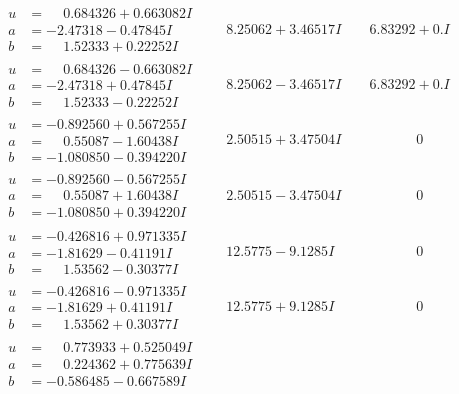 \documentclass[1p]{elsarticle_modified}
\theoremstyle{definition}
\begin{document}
$$\begin{array}{c|c|c}
\begin{aligned}
u &= \phantom{-}0.684326 + 0.663082 I \\
a &= -2.47318 - 0.47845 I \\
b &= \phantom{-}1.52333 + 0.22252 I\end{aligned}
 & \phantom{-}8.25062 + 3.46517 I & \phantom{-}6.83292 + 0. I\phantom{ +0.000000I} \\ \hline\begin{aligned}
u &= \phantom{-}0.684326 - 0.663082 I \\
a &= -2.47318 + 0.47845 I \\
b &= \phantom{-}1.52333 - 0.22252 I\end{aligned}
 & \phantom{-}8.25062 - 3.46517 I & \phantom{-}6.83292 + 0. I\phantom{ +0.000000I} \\ \hline\begin{aligned}
u &= -0.892560 + 0.567255 I \\
a &= \phantom{-}0.55087 - 1.60438 I \\
b &= -1.080850 - 0.394220 I\end{aligned}
 & \phantom{-}2.50515 + 3.47504 I & \phantom{-0.000000 } 0 \\ \hline\begin{aligned}
u &= -0.892560 - 0.567255 I \\
a &= \phantom{-}0.55087 + 1.60438 I \\
b &= -1.080850 + 0.394220 I\end{aligned}
 & \phantom{-}2.50515 - 3.47504 I & \phantom{-0.000000 } 0 \\ \hline\begin{aligned}
u &= -0.426816 + 0.971335 I \\
a &= -1.81629 - 0.41191 I \\
b &= \phantom{-}1.53562 - 0.30377 I\end{aligned}
 & \phantom{-}12.5775 - 9.1285 I & \phantom{-0.000000 } 0 \\ \hline\begin{aligned}
u &= -0.426816 - 0.971335 I \\
a &= -1.81629 + 0.41191 I \\
b &= \phantom{-}1.53562 + 0.30377 I\end{aligned}
 & \phantom{-}12.5775 + 9.1285 I & \phantom{-0.000000 } 0 \\ \hline\begin{aligned}
u &= \phantom{-}0.773933 + 0.525049 I \\
a &= \phantom{-}0.224362 + 0.775639 I \\
b &= -0.586485 - 0.667589 I\end{aligned}

\end{array}$$
\end{document}
